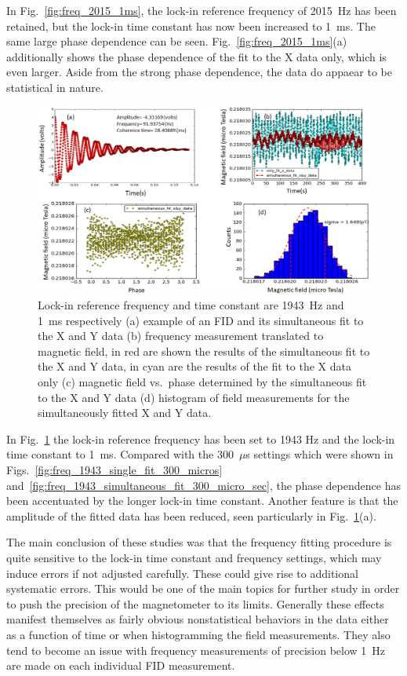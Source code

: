 In Fig.~\ref{fig:freq_2015_1ms}, the lock-in reference frequency of
2015~Hz has been retained, but the lock-in time constant has now been
increased to 1~ms.  The same large phase dependence can be seen.
Fig.~\ref{fig:freq_2015_1ms}(a) additionally shows the phase
dependence of the fit to the X data only, which is even larger.  Aside
from the strong phase dependence, the data do appaear to be
statistical in nature.

\begin{figure}%
\centering\includegraphics[width=0.9\linewidth]{figures/freq_1943_simultaneous_fit_1ms.png}
\caption{Lock-in reference frequency and time constant are 1943~Hz and
  1~ms respectively (a) example of an FID and its simultaneous fit to
  the X and Y data (b) frequency measurement translated to magnetic
  field, in red are shown the results of the simultaneous fit to the X
  and Y data, in cyan are the results of the fit to the X data only
  (c) magnetic field vs.~phase determined by the simultaneous fit to
  the X and Y data (d) histogram of field measurements for the
  simultaneously fitted X and Y
  data.\label{fig:freq_1943_simultaneous_fit_1ms}}
\end{figure}

In Fig.~\ref{fig:freq_1943_simultaneous_fit_1ms} the lock-in reference
frequency has been set to 1943 Hz and the lock-in time constant to
1~ms.  Compared with the 300~$\mu$s settings which were shown in
Figs.~\ref{fig:freq_1943_single_fit_300_micros}
and~\ref{fig:freq_1943_simultaneous_fit_300_micro_sec}, the phase
dependence has been accentuated by the longer lock-in time constant.
Another feature is that the amplitude of the fitted data has been
reduced, seen particularly in
Fig.~\ref{fig:freq_1943_simultaneous_fit_1ms}(a).

The main conclusion of these studies was that the frequency fitting
procedure is quite sensitive to the lock-in time constant and
frequency settings, which may induce errors if not adjusted carefully.
These could give rise to additional systematic errors.  This would be
one of the main topics for further study in order to push the
precision of the magnetometer to its limits.  Generally these effects
manifest themselves as fairly obvious nonstatistical behaviors in the
data either as a function of time or when histogramming the field
measurements.  They also tend to become an issue with frequency
measurements of precision below 1~Hz are made on each individual FID
measurement.

